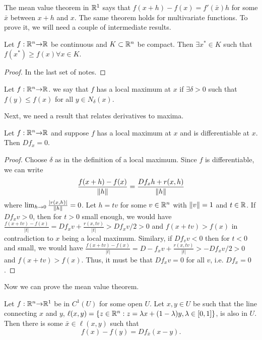 The mean value theorem in $\mathbb{R}^1$ says that $f(x+h) - f(x) =
f'(\bar{x}) h$ for some $\bar{x}$ between $x+h$ and $x$. The same
theorem holds for multivariate functions. To prove it, we will need a
couple of intermediate results. 
\begin{theorem}
  Let $f:\mathbb{R}^n {\rightarrow} \mathbb{R}$ be continuous and $K \subset \mathbb{R}^n$ be
  compact. Then $\exists x^* \in K$ such that $f(x^*) \geq f(x)
  \forall x \in K$. 
\end{theorem}
\begin{proof}
  In the last set of notes.
\end{proof}
\begin{definition}
  Let $f: \mathbb{R}^n {\rightarrow} \mathbb{R}$. we say that $f$ has a local maximum at $x$ if
  $\exists \delta > 0$ such that $f(y) \leq f(x)$ for all $y \in
  N_\delta(x)$. 
\end{definition}
Next, we need a result that relates derivatives to maxima. 
\begin{theorem}\label{thm:localmax}
  Let $f: \mathbb{R}^n {\rightarrow} \mathbb{R}$ and suppose $f$ has a local maximum at $x$ and
  is differentiable at $x$. Then $Df_x = 0$. 
\end{theorem}
\begin{proof}
  Choose $\delta$ as in the definition of a local maximum. Since $f$
  is differentiable, we can write
  \[ \frac{f(x+h) - f(x)}{\left\Vert {h} \right\Vert} =\frac{ Df_x h +
    r(x,h)}{\left\Vert {h} \right\Vert} \] where $\lim_{h {\rightarrow} 0}
  \frac{|r(x,h)|}{\left\Vert {h} \right\Vert} = 0$. Let $h = t v$ for some $v \in \mathbb{R}^n$
  with $\left\Vert {v} \right\Vert =1$ and $t \in \mathbb{R}$. If $D f_x v > 0$, then for $t>0$
  small enough, we would have $\frac{f(x+tv) - f(x)}{|t|} = D
  f_x v + \frac{r(x,tv)}{|t|} > D
  f_x v / 2 > 0$ and $f(x+tv)> f(x)$ in contradiction to $x$ being a
  local maximum. Similary, if $D f_v v < 0$ then for $t<0$ and small,
  we would have $\frac{f(x+tv) - f(x)}{|t|} = D
  -f_x v + \frac{r(x,tv)}{|t|} > -D
  f_x v / 2 > 0$ and $f(x+tv)> f(x)$. Thus, it must be that $D f_x v =
  0$ for all $v$, i.e. $D f_x = 0$. 
\end{proof}
Now we can prove the mean value theorem.
\begin{theorem}\label{thm:mvt}
  Let $f:\mathbb{R}^n {\rightarrow} \mathbb{R}^1$ be in $C^1(U)$ for some open $U$. Let $x, y
  \in U$ be such that the line connecting $x$ and $y$, $\ell(x,y) =
  \{z\in \mathbb{R}^n: z = \lambda x + (1-\lambda) y, \lambda \in [0,1]\}$, is
  also in $U$. Then there is some $\bar{x} \in \ell(x,y)$ such that
  \[ f(x) - f(y) = Df_{\bar{x}} (x-y). \]
\end{theorem}
